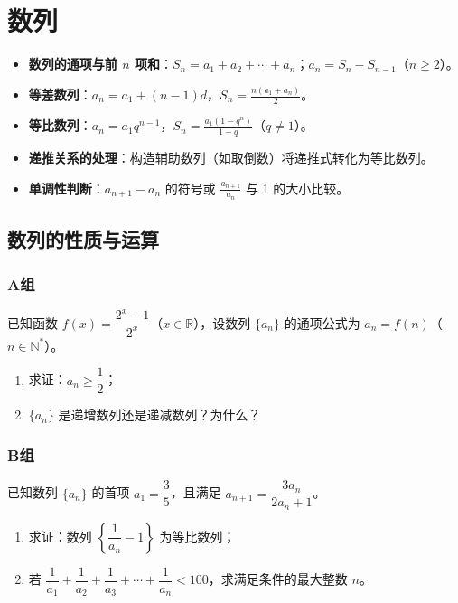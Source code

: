 \chapter{数列}
\setcounter{choicecounter}{0}

\begin{knowledgeframe}
\begin{itemize}
	\item \textbf{数列的通项与前 $n$ 项和}：$S_n = a_1 + a_2 + \cdots + a_n$；$a_n = S_n - S_{n-1}$（$n \ge 2$）。
	\item \textbf{等差数列}：$a_n = a_1 + (n-1)d$，$S_n = \frac{n(a_1+a_n)}{2}$。
	\item \textbf{等比数列}：$a_n = a_1 q^{n-1}$，$S_n = \frac{a_1(1-q^n)}{1-q}$（$q \ne 1$）。
	\item \textbf{递推关系的处理}：构造辅助数列（如取倒数）将递推式转化为等比数列。
	\item \textbf{单调性判断}：$a_{n+1}-a_n$ 的符号或 $\frac{a_{n+1}}{a_n}$ 与 1 的大小比较。
\end{itemize}
\end{knowledgeframe}

\section{数列的性质与运算}

\startexercise

\subsection*{A组}

\begin{exercise}[选修二P9习题]
	已知函数 $f(x) = \dfrac{2^x - 1}{2^x}$（$x \in \mathbb{R}$），设数列 $\{a_n\}$ 的通项公式为 $a_n = f(n)$（$n \in \mathbb{N}^*$）。
	\begin{enumerate}
		\item[(1)] 求证：$a_n \ge \dfrac{1}{2}$；
		\item[(2)] $\{a_n\}$ 是递增数列还是递减数列？为什么？
	\end{enumerate}
\end{exercise}

\subsection*{B组}

\begin{exercise}
	已知数列 $\{a_n\}$ 的首项 $a_1 = \dfrac{3}{5}$，且满足 $a_{n+1} = \dfrac{3a_n}{2a_n+1}$。
	\begin{enumerate}
		\item[(1)] 求证：数列 $\left\{\dfrac{1}{a_n} - 1\right\}$ 为等比数列；
		\item[(2)] 若 $\dfrac{1}{a_1} + \dfrac{1}{a_2} + \dfrac{1}{a_3} + \cdots + \dfrac{1}{a_n} < 100$，求满足条件的最大整数 $n$。
	\end{enumerate}
\end{exercise}

